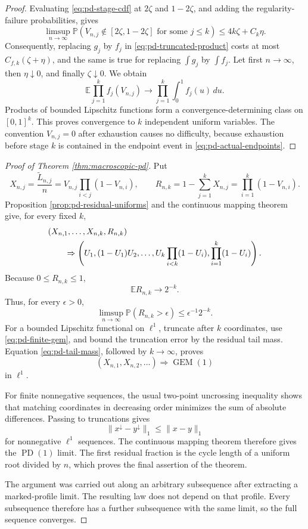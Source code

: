 \documentclass[11pt]{article}
\theoremstyle{remark}
\newcommand{\Pp}{\mathbb P}
\newcommand{\Ee}{\mathbb E}
\newcommand{\dd}{\,d}
\begin{document}
\begin{proof}
Evaluating \eqref{eq:pd-stage-cdf} at $2\zeta$ and $1-2\zeta$, and adding the
regularity-failure probabilities, gives
\begin{equation}
 \limsup_{n\to\infty}\Pp\left(
 V_{n,j}\notin[2\zeta,1-2\zeta]
 \text{ for some }j\le k\right)
 \le4k\zeta+C_k\eta.
 \label{eq:pd-actual-endpoints}
\end{equation}
Consequently, replacing $g_j$ by $f_j$ in
\eqref{eq:pd-truncated-product} costs at most
$C_{f,k}(\zeta+\eta)$, and the same is true for replacing
$\int g_j$ by $\int f_j$.  Let first $n\to\infty$, then
$\eta\downarrow0$, and finally $\zeta\downarrow0$.  We obtain
\[
        \Ee\prod_{j=1}^kf_j(V_{n,j})
        \longrightarrow
        \prod_{j=1}^k\int_0^1f_j(u)\dd u.
\]
Products of bounded Lipschitz functions form a convergence-determining class on
$[0,1]^k$.  This proves convergence to $k$ independent uniform variables.
The convention $V_{n,j}=0$ after exhaustion causes no difficulty, because
exhaustion before stage $k$ is contained in the endpoint event in
\eqref{eq:pd-actual-endpoints}.
\end{proof}

\begin{proof}[Proof of Theorem \ref{thm:macroscopic-pd}]
Put
\[
 X_{n,j}=\frac{\widetilde L_{n,j}}n
 =V_{n,j}\prod_{i<j}(1-V_{n,i}),
 \qquad
 R_{n,k}=1-\sum_{j=1}^kX_{n,j}
        =\prod_{i=1}^k(1-V_{n,i}).
\]
Proposition \ref{prop:pd-residual-uniforms} and the continuous mapping theorem
give, for every fixed $k$,
\begin{align}
 &(X_{n,1},\ldots,X_{n,k},R_{n,k})\notag\\
 &\qquad\Rightarrow
 \left(U_1,(1-U_1)U_2,\ldots,
 U_k\prod_{i<k}(1-U_i),\prod_{i=1}^k(1-U_i)\right).
 \label{eq:pd-finite-gem}
\end{align}
Because $0\le R_{n,k}\le1$,
\[
        \Ee R_{n,k}\longrightarrow2^{-k}.
\]
Thus, for every $\epsilon>0$,
\[
 \limsup_{n\to\infty}\Pp(R_{n,k}>\epsilon)
 \le\epsilon^{-1}2^{-k}.
 \label{eq:pd-tail-mass}
\]
For a bounded Lipschitz functional on $\ell^1$, truncate after $k$ coordinates,
use \eqref{eq:pd-finite-gem}, and bound the truncation error by the residual
tail mass.  Equation \eqref{eq:pd-tail-mass}, followed by $k\to\infty$, proves
\[
        (X_{n,1},X_{n,2},\ldots)
        \Rightarrow\operatorname{GEM}(1)
\]
in $\ell^1$.

For finite nonnegative sequences, the usual two-point uncrossing inequality
shows that matching coordinates in decreasing order minimizes the sum of
absolute differences.  Passing to truncations gives
\[
        \|x^\downarrow-y^\downarrow\|_1\le\|x-y\|_1
\]
for nonnegative $\ell^1$ sequences.  The continuous mapping theorem therefore
gives the $\operatorname{PD}(1)$ limit.  The first residual fraction is the
cycle length of a uniform root divided by $n$, which proves the final assertion
of the theorem.

The argument was carried out along an arbitrary subsequence after extracting a
marked-profile limit.  The resulting law does not depend on that profile.
Every subsequence therefore has a further subsequence with the same limit, so
the full sequence converges.
\end{proof}
\end{document}
